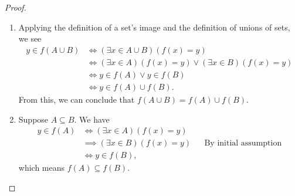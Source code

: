 \documentclass[12pt,a4paper]{article}
\theoremstyle{theorem}
\theoremstyle{definition}
\begin{document}
\begin{proof}
\begin{enumerate}
\item Applying the definition of a set's image and the definition of unions of sets,  we see
\begin{align*}
y \in f(A \cup B) &\iff (\exists x \in A \cup B)(f(x) = y)\\
&\iff (\exists x \in A)(f(x) = y) \lor (\exists x \in B)(f(x) = y)\\
&\iff y \in f(A) \lor y \in f(B)\\
&\iff y \in f(A) \cup f(B) \text{.}
\end{align*}
From this,  we can conclude that $f(A \cup B) = f(A) \cup f(B)$.

\item Suppose $A \subseteq B$.  We have
\begin{align*}
y \in f(A) &\iff (\exists x \in A)(f(x) = y) && \\
&\implies (\exists x \in B) (f(x) = y) && \text{By initial assumption}\\
&\iff y \in f(B) \text{,}
\end{align*}
which means $f(A) \subseteq f(B)$.


\end{enumerate}
\end{proof}
\end{document}
